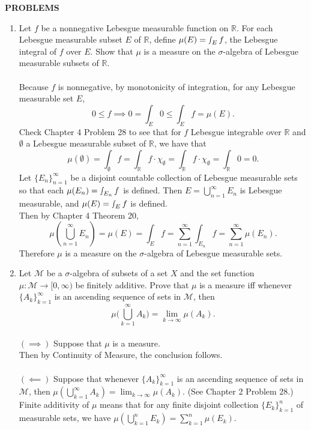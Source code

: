 \begin{center}
	\textbf{PROBLEMS}
\end{center}
\begin{enumerate}
	\setcounter{enumi}{0}
	\item Let $f$ be a nonnegative Lebesgue measurable function on $\mathbb{R}$. 
	For each Lebesgue measurable subset $E$ of $\mathbb{R}$, define $\mu(E) = \smallint_E f$, the Lebesgue integral of $f$ over $E$.
	Show that $\mu$ is a measure on the $\sigma$-algebra of Lebesgue measurable subsets of $\mathbb{R}$.\\
	\\Because $f$ is nonnegative, by monotonicity of integration, for any Lebesgue measurable set $E$, 
	\[
		0\le f\implies 0=\int_E 0\le \int_E f=\mu(E).
	\]
	Check Chapter 4 Problem 28 to see that for $f$ Lebesgue integrable over $\mathbb{R}$ and $\emptyset$ a Lebesgue measurable subset of $\mathbb{R}$, we have that
	\[
		\mu(\emptyset)=\int_\emptyset f=\int_\mathbb{R} f\cdot\chi_\emptyset=\int_\mathbb{R} f\cdot\chi_\emptyset=\int_\mathbb{R} 0 = 0.
	\]
	Let $\{E_n\}_{n=1}^\infty$ be a disjoint countable collection of Lebesgue measurable sets so that each $\mu(E_n) = \smallint_{E_n} f$ is defined.
	Then $E=\bigcup_{n=1}^\infty E_n$ is Lebesgue measurable, and $\mu(E) = \smallint_E f$ is defined.
	\\Then by Chapter 4 Theorem 20,
	\[
		\mu(\bigcup_{n=1}^\infty E_n)=\mu(E)=\int_E f =\sum_{n=1}^\infty\int_{E_n}f=\sum_{n=1}^\infty\mu(E_n).
	\]
	Therefore $\mu$ is a measure on the $\sigma$-algebra of Lebesgue measurable sets. 
	\item Let $\mathcal{M}$ be a $\sigma$-algebra of subsets of a set $X$ and the set function $\mu : \mathcal{M} \to [0,\infty)$ be finitely additive.
	Prove that $\mu$ is a measure iff whenever $\{A_k\}_{k=1}^\infty$ is an ascending sequence of sets in $\mathcal{M}$, then
	\[
	\mu \biggl ( \bigcup_{k=1}^\infty A_k \biggr ) = \lim_{k \to \infty} \mu(A_k).	
	\]
	\\$(\implies)$ Suppose that $\mu$ is a measure.\\
	Then by Continuity of Measure, the conclusion follows.\\
	\\$(\impliedby)$ Suppose that whenever $\{A_k\}_{k=1}^\infty$ is an ascending sequence of sets in $\mathcal{M}$, then $\mu ( \bigcup_{k=1}^\infty A_k ) = \lim_{k \to \infty} \mu(A_k)$.
	(See Chapter 2 Problem 28.)\\
	Finite additivity of $\mu$ means that for any finite disjoint collection $\{E_k\}_{k=1}^n$ of measurable sets, we have $\mu(\bigcup_{k=1}^n E_k)=\sum_{k=1}^n\mu(E_k)$.

\end{enumerate}
